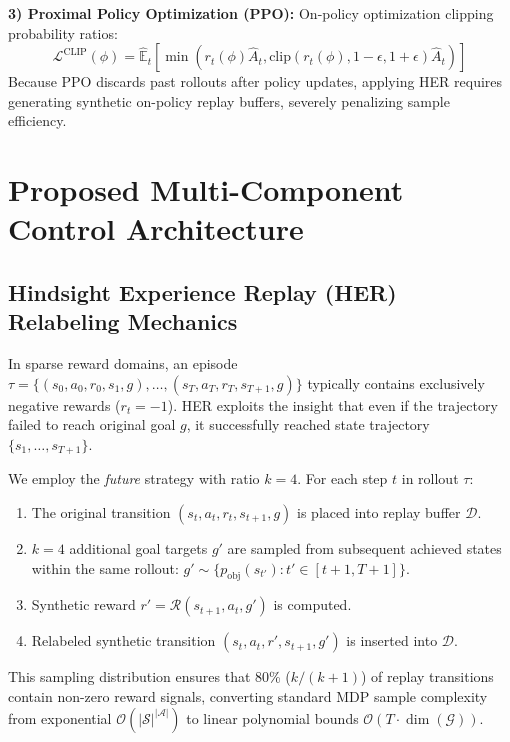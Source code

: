\documentclass[10pt,twocolumn,a4paper]{article}
\newcommand{\E}{\mathbb{E}}
\begin{document}
\textbf{3) Proximal Policy Optimization (PPO):} On-policy optimization clipping probability ratios:
\begin{equation}
  \mathcal{L}^{\text{CLIP}}(\phi) = \hat{\E}_t \left[ \min(r_t(\phi)\hat{A}_t, \text{clip}(r_t(\phi), 1-\epsilon, 1+\epsilon)\hat{A}_t) \right]
  \label{eq:ppo_clip}
\end{equation}
Because PPO discards past rollouts after policy updates, applying HER requires generating synthetic on-policy replay buffers, severely penalizing sample efficiency.

\section{Proposed Multi-Component Control Architecture}
\label{sec:architecture}

\subsection{Hindsight Experience Replay (HER) Relabeling Mechanics}
In sparse reward domains, an episode $\tau = \{(s_0, a_0, r_0, s_1, g), \dots, (s_T, a_T, r_T, s_{T+1}, g)\}$ typically contains exclusively negative rewards ($r_t = -1$). HER exploits the insight that even if the trajectory failed to reach original goal $g$, it successfully reached state trajectory $\{s_1, \dots, s_{T+1}\}$.

We employ the \textit{future} strategy with ratio $k=4$. For each step $t$ in rollout $\tau$:
\begin{enumerate}
  \item The original transition $(s_t, a_t, r_t, s_{t+1}, g)$ is placed into replay buffer $\mathcal{D}$.
  \item $k=4$ additional goal targets $g'$ are sampled from subsequent achieved states within the same rollout: $g' \sim \{p_{\text{obj}}(s_{t'}) : t' \in [t+1, T+1]\}$.
  \item Synthetic reward $r' = \mathcal{R}(s_{t+1}, a_t, g')$ is computed.
  \item Relabeled synthetic transition $(s_t, a_t, r', s_{t+1}, g')$ is inserted into $\mathcal{D}$.
\end{enumerate}
This sampling distribution ensures that 80\% ($k/(k+1)$) of replay transitions contain non-zero reward signals, converting standard MDP sample complexity from exponential $\mathcal{O}(|\mathcal{S}|^{|\mathcal{A}|})$ to linear polynomial bounds $\mathcal{O}(T \cdot \dim(\mathcal{G}))$.
\end{document}
